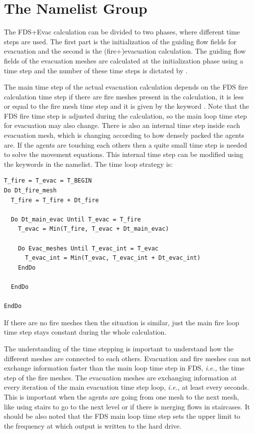 \documentclass[12pt,a4paper,final,twoside]{stylevk}
\begin{document}
\section{The  Namelist Group}\label{Sec_TimeNML}

The FDS+Evac calculation can be divided to two phases, where different
time steps are used.  The first part is the initialization of the
guiding flow fields for evacuation and the second is the
(fire+)evacuation calculation.  The guiding flow fields of the
evacuation meshes are calculated at the initialization phase using a
time step  and the number of these time
steps is dictated by .


The main time step of the actual evacuation calculation depends on the
FDS fire calculation time step if there are fire meshes present in the
calculation, it is less or equal to the fire mesh time step and it is
given by the keyword .  Note that the
FDS fire time step is adjusted during the calculation, so the main
loop time step for evacuation may also change.  There is also an
internal time step inside each evacuation mesh, which is changing
according to how densely packed the agents are.  If the agents are
touching each others then a quite small time step is needed to solve
the movement equations.  This internal time step can be modified using
the keywords in the  namelist.  The time loop strategy is:
\begin{verbatim}
T_fire = T_evac = T_BEGIN
Do Dt_fire_mesh
  T_fire = T_fire + Dt_fire

  Do Dt_main_evac Until T_evac = T_fire
    T_evac = Min(T_fire, T_evac + Dt_main_evac)

    Do Evac_meshes Until T_evac_int = T_evac
      T_evac_int = Min(T_evac, T_evac_int + Dt_evac_int)
    EndDo

  EndDo

EndDo
\end{verbatim}
If there are no fire meshes then the situation is similar, just the
main fire loop time step stays constant during the whole calculation.


The understanding of the time stepping is important to understand how
the different meshes are connected to each others.  Evacuation and
fire meshes can not exchange information faster than the main loop
time step in FDS, \emph{i.e.,} the time step of the fire meshes.  The
evacuation meshes are exchanging information at every iteration of the
main evacuation time step loop, \emph{i.e.,} at least every
 seconds.  This is important when the
agents are going from one mesh to the next mesh, like using stairs to
go to the next level or if there is merging flows in staircases.  It
should be also noted that the FDS main loop time step sets the upper
limit to the frequency at which output is written to the hard drive.
\end{document}
